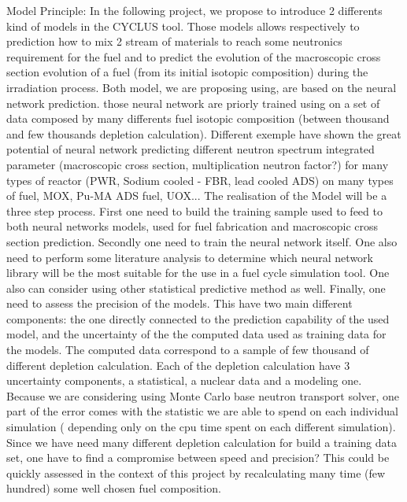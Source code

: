 \documentclass[dvips,12pt]{article}
\begin{document}
Model Principle:
In the following project, we propose to introduce 2 differents kind of models in the CYCLUS tool. Those models allows respectively to prediction how to mix 2 stream of materials to reach some neutronics requirement for the fuel and to predict the evolution of the macroscopic cross section evolution of a fuel (from its initial isotopic composition) during the irradiation process.
Both model, we are proposing using, are based on the neural network prediction. those neural network are priorly trained using on a set of data composed by many differents fuel isotopic composition (between thousand and few thousands depletion calculation). Different exemple have shown the great potential of neural network predicting different neutron spectrum integrated parameter (macroscopic cross section, multiplication neutron factor?) for many types of reactor (PWR, Sodium cooled - FBR,  lead cooled ADS) on many types of fuel, MOX, Pu-MA ADS fuel, UOX...
The realisation of the Model will be a three step process. First one need to build the training sample used to feed to both neural networks models, used for fuel fabrication and macroscopic cross section prediction.  Secondly one need to train the neural network itself. One also need to perform some literature analysis to determine which neural network library will be the most suitable for the use in a fuel cycle simulation tool. One also can consider using other statistical predictive method as well.
Finally, one need to assess the precision of the models. This have two main different components: the one directly connected to the prediction capability of the used model, and the uncertainty of the the computed data used as training data for the models.
The computed data correspond to a sample of few thousand of different depletion calculation. Each of the depletion calculation have 3 uncertainty components, a statistical, a nuclear data and a modeling one. 
Because we are considering using Monte Carlo base neutron transport solver, one part of the error comes with the statistic we are able to spend on each individual simulation ( depending only on the cpu time spent on each different simulation). Since we have need many different depletion calculation for build a training data set, one have to find a compromise between speed and precision? This could be quickly assessed in the context of this project by recalculating many time (few hundred) some well chosen fuel composition.
\end{document}
